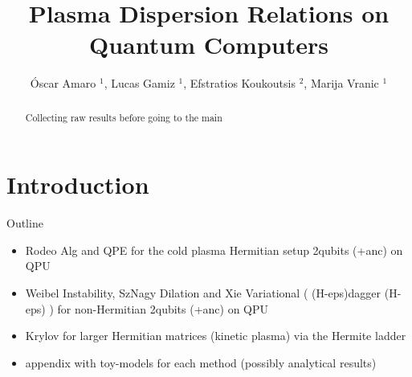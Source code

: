 \documentclass[12pt]{iopart}
\begin{document}

\title[Plasma Dispersion Relations on Quantum Computers]{Plasma Dispersion Relations on Quantum Computers}


\author{
    Óscar Amaro  $^1$,
    Lucas Gamiz  $^1$, %
    Efstratios Koukoutsis  $^2$,
    Marija Vranic  $^1$ %
  }

\address{$^1$ GoLP/Instituto de Plasma e Fus\~ao Nuclear, Instituto Superior T\'ecnico, Universidade de Lisboa, Lisbon, Portugal\\
$^2$ School of Electrical and Computer Engineering,
National Technical University of Athens, Zographou 15780, Greece\\
}

\normalsize

\vspace{10pt}

\begin{abstract}

Collecting raw results before going to the main

\end{abstract}


\section{Introduction}

Outline
\begin{itemize}
    \item Rodeo Alg and QPE for the cold plasma Hermitian setup 2qubits (+anc) on QPU
    \item Weibel Instability, SzNagy Dilation and Xie Variational ( (H-eps)dagger (H-eps) ) for non-Hermitian 2qubits (+anc) on QPU
    \item Krylov for larger Hermitian matrices (kinetic plasma) via the Hermite ladder
    \item appendix with toy-models for each method (possibly analytical results)
\end{itemize}
\end{document}
